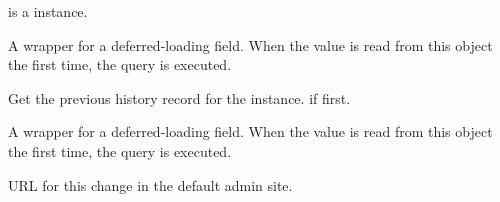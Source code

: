 \documentclass[letterpaper,10pt,english]{sphinxmanual}
\begin{document}
\begin{fulllineitems}
\begin{fulllineitems}
 is a  instance.

\end{fulllineitems}


\begin{fulllineitems}
\label{\detokenize{modules/models:gestion.models.HistoricalMenuHistory.paymentMethod_id}}
A wrapper for a deferred-loading field. When the value is read from this
object the first time, the query is executed.

\end{fulllineitems}


\begin{fulllineitems}
\label{\detokenize{modules/models:gestion.models.HistoricalMenuHistory.prev_record}}
Get the previous history record for the instance.  if first.

\end{fulllineitems}


\begin{fulllineitems}
\label{\detokenize{modules/models:gestion.models.HistoricalMenuHistory.quantity}}
A wrapper for a deferred-loading field. When the value is read from this
object the first time, the query is executed.

\end{fulllineitems}


\begin{fulllineitems}
\label{\detokenize{modules/models:gestion.models.HistoricalMenuHistory.revert_url}}
URL for this change in the default admin site.

\end{fulllineitems}


\end{fulllineitems}
\end{document}
